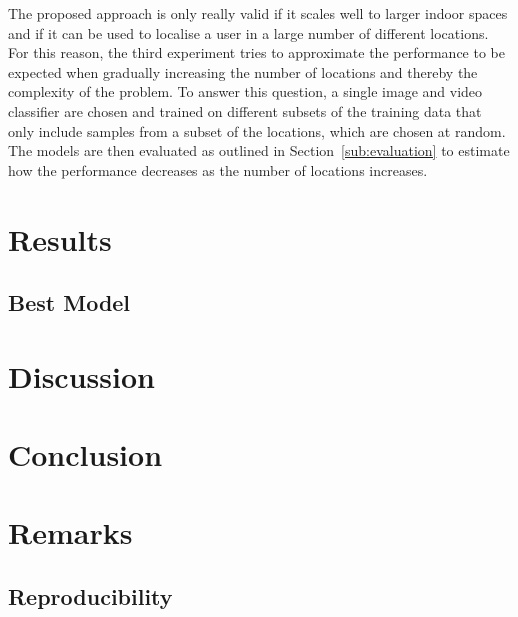 \documentclass[a4paper]{article}
\begin{document}
  The proposed approach is only really valid if it scales well to larger indoor
  spaces and if it can be used to localise a user in a large number of different
  locations. For this reason, the third experiment tries to approximate the
  performance to be expected when gradually increasing the number of locations
  and thereby the complexity of the problem. To answer this question, a single
  image and video classifier are chosen and trained on different subsets of the
  training data that only include samples from a subset of the locations, which
  are chosen at random. The models are then evaluated as outlined in
  Section~\ref{sub:evaluation} to estimate how the performance decreases as the
  number of locations increases.



  \section{Results} %
  \label{sec:results}

  \subsection{Best Model} %



  \section{Discussion} %
  \label{sec:discussion}


  \section{Conclusion} %
  \label{sec:conclusion}


  \section{Remarks} %
  \label{sec:remarks}

  \subsection{Reproducibility} %
  \label{sub:reproducibility}
\end{document}
